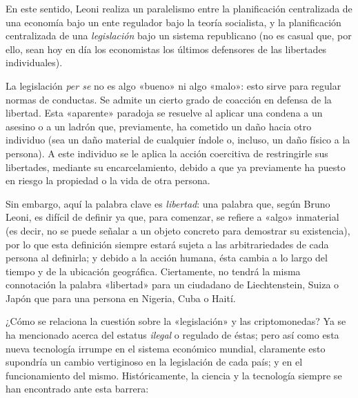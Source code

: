 \documentclass[12pt,a4paper,twoside]{book}
\begin{document}
En este sentido, Leoni realiza un paralelismo entre la planificación centralizada de una economía bajo un ente regulador bajo la teoría socialista, y la planificación centralizada de una \textit{legislación} bajo un sistema republicano (no es casual que, por ello, sean hoy en día los economistas los últimos defensores de las libertades individuales).

La legislación \textit{per se} no es algo «bueno» ni algo «malo»: esto sirve para regular normas de conductas. Se admite un cierto grado de coacción en defensa de la libertad. Esta «aparente» paradoja se resuelve al aplicar una condena a un asesino o a un ladrón que, previamente, ha cometido un daño hacia otro individuo (sea un daño material de cualquier índole o, incluso, un daño físico a la persona). A este individuo se le aplica la acción coercitiva de restringirle sus libertades, mediante su encarcelamiento, debido a que ya previamente ha puesto en riesgo la propiedad o la vida de otra persona.

Sin embargo, aquí la palabra clave es \textit{libertad}: una palabra que, según Bruno Leoni, es difícil de definir ya que, para comenzar, se refiere a «algo» inmaterial (es decir, no se puede señalar a un objeto concreto para demostrar su existencia), por lo que esta definición siempre estará sujeta a las arbitrariedades de cada persona al definirla; y debido a la acción humana, ésta cambia a lo largo del tiempo y de la ubicación geográfica. Ciertamente, no tendrá la misma connotación la palabra «libertad» para un ciudadano de Liechtenstein, Suiza o Japón que para una persona en Nigeria, Cuba o Haití.

¿Cómo se relaciona la cuestión sobre la «legislación» y las criptomonedas? Ya se ha mencionado acerca del estatus \textit{ilegal} o regulado de éstas; pero así como esta nueva tecnología irrumpe en el sistema económico mundial, claramente esto supondría un cambio vertiginoso en la legislación de cada país; y en el funcionamiento del mismo. Históricamente, la ciencia y la tecnología siempre se han encontrado ante esta barrera:
\end{document}
